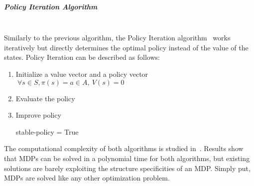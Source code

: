 \subparagraph{Policy Iteration Algorithm}\textbf{\\}
Similarly to the previous algorithm, the Policy Iteration algorithm~\cite{policyiteration} works iteratively but directly determines the optimal policy instead of the value of the states.
Policy Iteration can be described as follows:
\begin{enumerate}
    \item Initialize a value vector and a policy vector $~\forall s\in S,\pi(s)=a\in A,~V(s)=0$
    \item Evaluate the policy
        \begin{algorithm}
        \end{algorithm}\newpage
    \item Improve policy
    \begin{algorithm}
        stable-policy = True\\
    \end{algorithm}
\end{enumerate}



The computational complexity of both algorithms is studied in~\cite{mdpcomplexity}.
Results show that MDPs can be solved in a polynomial time for both algorithms, but existing solutions are barely exploiting the structure specificities of an MDP. Simply put, MDPs are solved like any other optimization problem.

